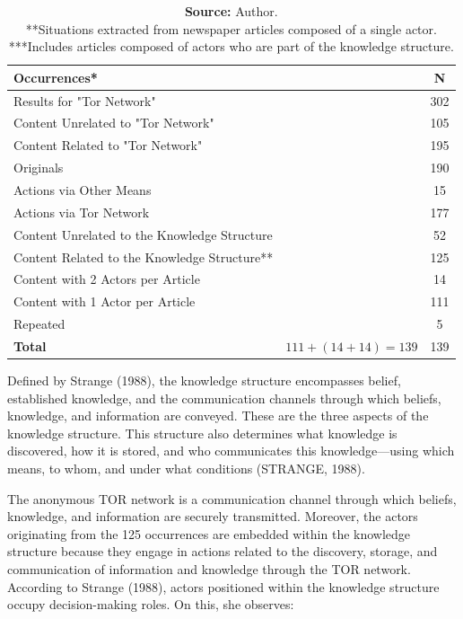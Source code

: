 \begin{table}[ht]
    \centering
    \caption{\textbf{Number of Occurrences for Analysis (2007-2017)}}
    \label{tab:occurrences_analysis}
    \begin{tabular}{lp{3.8cm}c}
        \toprule
        \textbf{Occurrences*} & \textbf{} & \textbf{N} \\
        \midrule
        Results for "Tor Network" &  & 302 \\
        \quad Content Unrelated to "Tor Network" &  & 105 \\
        \quad Content Related to "Tor Network" &  & 195 \\
        \midrule
        Originals &  & 190 \\
        \quad Actions via Other Means &  & 15 \\
        \quad Actions via Tor Network &  & 177 \\
        \qquad Content Unrelated to the Knowledge Structure &  & 52 \\
        \qquad Content Related to the Knowledge Structure** &  & 125 \\
        \qquad \quad Content with 2 Actors per Article &  & 14 \\
        \qquad \quad Content with 1 Actor per Article &  & 111 \\
        \midrule
        Repeated &  & 5 \\
        \midrule
        \textbf{Total} & \(111 + (14+14) = 139\) & 139 \\
        \bottomrule
    \end{tabular}

    \caption*{\textbf{Source:} Author.\\
    **Situations extracted from newspaper articles composed of a single actor.\\
    ***Includes articles composed of actors who are part of the knowledge structure.}
\end{table}


Defined by Strange (1988), the knowledge structure encompasses belief, established knowledge, and the communication channels through which beliefs, knowledge, and information are conveyed. These are the three aspects of the knowledge structure. This structure also determines what knowledge is discovered, how it is stored, and who communicates this knowledge—using which means, to whom, and under what conditions (STRANGE, 1988). 

The anonymous TOR network is a communication channel through which beliefs, knowledge, and information are securely transmitted. Moreover, the actors originating from the 125 occurrences are embedded within the knowledge structure because they engage in actions related to the discovery, storage, and communication of information and knowledge through the TOR network. According to Strange (1988), actors positioned within the knowledge structure occupy decision-making roles. On this, she observes:

